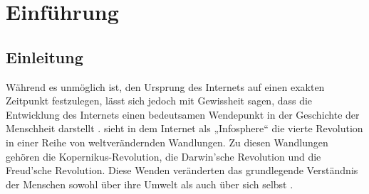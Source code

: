 \documentclass[a4paper]{scrartcl}
\begin{document}

\newpage

\setcounter{page}{1}


\section{Einführung}

\subsection{Einleitung}
Während es unmöglich ist, den Ursprung des Internets auf einen exakten Zeitpunkt festzulegen, lässt sich jedoch mit Gewissheit sagen, dass die Entwicklung des Internets einen bedeutsamen Wendepunkt in der Geschichte der Menschheit darstellt \autocite[26]{Kleinrock}. \textcite{Floridi} sieht in dem Internet als „Infosphere“ \autocite[9]{Floridi} die vierte Revolution in einer Reihe von weltverändernden Wandlungen. Zu diesen Wandlungen gehören die Kopernikus-Revolution, die Darwin'sche Revolution und die Freud'sche Revolution. Diese Wenden veränderten das grundlegende Verständnis der Menschen sowohl über ihre Umwelt als auch über sich selbst \autocite[8f.]{Floridi}. \\
\end{document}
